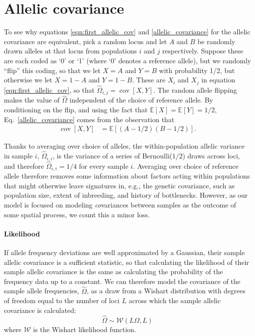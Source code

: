 \documentclass[10pt,letterpaper]{article}
\newcommand{\E}{\mathbb{E}}
\newcommand{\cov}{\mathop{\mbox{cov}}}
\begin{document}
\section*{Allelic covariance}\label{allelic_cov}
To see why equations
\eqref{eqn:first_allelic_cov} and \eqref{allelic_covariance}
for the allelic covariance are equivalent,
pick a random locus and
let $A$ and $B$ be randomly drawn alleles at that locus from populations $i$ and $j$ respectively.
Suppose these are each coded as `0' or `1' (where `0' denotes a reference allele),
but we randomly ``flip'' this coding, so that we let $X=A$ and $Y=B$ with probability 1/2,
but otherwise we let $X=1-A$ and $Y=1-B$.
These are $X_i$ and $X_j$ in equation \eqref{eqn:first_allelic_cov},
so that $\widehat{\Omega}_{i,j} = \cov[X,Y]$. 
The random allele flipping makes the value of $\widehat{\Omega}$ 
independent of the choice of reference allele.
By conditioning on the flip,
and using the fact that $\E[X] = \E[Y] = 1/2$,
Eq.\ \eqref{allelic_covariance} comes from the observation that
\begin{align} \label{eqn:cov_xy}
\cov[X,Y] 
    &= \E[(A-1/2)(B-1/2)] .
\end{align}

Thanks to averaging over choice of alleles,
the within-population allelic variance in sample $i$, $\widehat{\Omega}_{i,i}$,
is the variance of a series of Bernoulli($1/2$) draws across loci,
and therefore $\widehat{\Omega}_{i,i} = 1/4$ for every sample $i$.
Averaging over choice of reference allele therefore removes some information 
about factors acting within populations that might otherwise leave signatures in, 
e.g., the genetic covariance, 
such as population size, extent of inbreeding, and history of bottlenecks.  
However, as our model is focused on modeling 
\emph{co}variances between samples as the outcome of some spatial process, 
we count this a minor loss.

\paragraph{Likelihood}
If allele frequency deviations are well approximated by a Gaussian, 
their sample allelic covariance is a sufficient statistic,
so that calculating the likelihood of their sample allelic covariance is the same as 
calculating the probability of the frequency data up to a constant. 
We can therefore model the covariance of the sample allele frequencies, $\widehat{\Omega}$, 
as a draw from a Wishart distribution with degrees of freedom equal to 
the number of loci $L$ across which the sample allelic covariance is calculated:
\begin{equation}
\widehat{\Omega} \sim \mathcal{W}\left( L\Omega, L	\right) 
\label{wishart}
\end{equation}
where $\mathcal{W}$ is the Wishart likelihood function.
\end{document}

